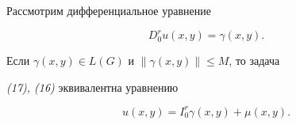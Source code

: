  


Рассмотрим дифференциальное уравнение 


\begin{equation} 


D_0^ru(x,y)=\gamma(x,y).\tag{17} 


\end{equation} 


 


\begin{lem} Если $\gamma(x,y)\in L(G)$ и $\|\gamma(x,y)\|\le M$, то задача 


{\em (17), (16)} эквивалентна уравнению 


\begin{equation} 


u(x,y)=I_0^r\gamma(x,y)+\mu(x,y). \tag{18}


\end{equation} 


\end{lem} 


 


